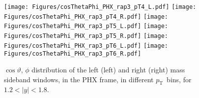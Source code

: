 \documentclass[12pt]{article}
\newcommand{\pt}{$p_{\mathrm{T}}$}
\begin{document}
\begin{figure}[htbp]
\centering
\texttt{[image: Figures/cosThetaPhi\_PHX\_rap3\_pT4\_L.pdf]}
\texttt{[image: Figures/cosThetaPhi\_PHX\_rap3\_pT4\_R.pdf]}
\texttt{[image: Figures/cosThetaPhi\_PHX\_rap3\_pT5\_L.pdf]}
\texttt{[image: Figures/cosThetaPhi\_PHX\_rap3\_pT5\_R.pdf]}
\texttt{[image: Figures/cosThetaPhi\_PHX\_rap3\_pT6\_L.pdf]}
\texttt{[image: Figures/cosThetaPhi\_PHX\_rap3\_pT6\_R.pdf]}
\caption{$\cos\vartheta,\,\phi$ distribution of the left (left) and
  right (right) mass sideband windows, in the PHX frame, in different
  \pt\ bins, for $1.2 < |y| < 1.8$.} 
\end{figure}
\clearpage
\end{document}

